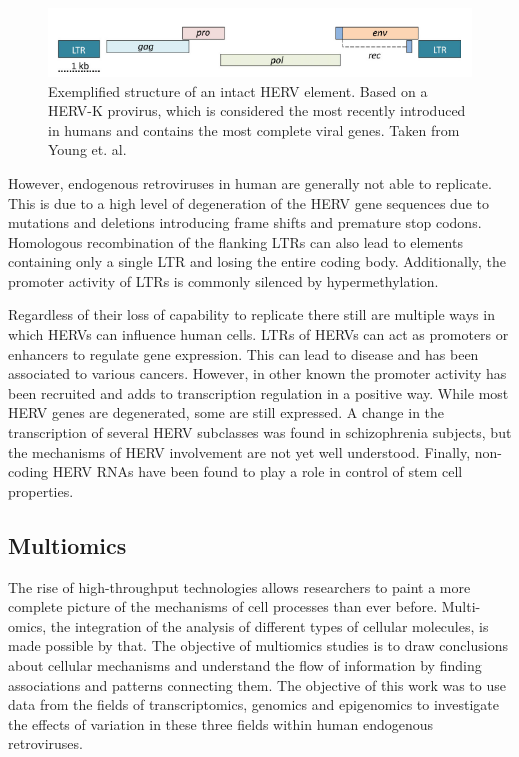 \documentclass[a4paper,12pt,twoside,openright]{article}
\begin{document}
\begin{figure}[b]
	\includegraphics[scale = 0.92, keepaspectratio = true]{../figures/herv_structure_example}  
	\caption{Exemplified structure of an intact HERV element. Based on a HERV-K provirus, which is considered the most recently introduced in humans and contains the most complete viral genes. Taken from Young et. al. \cite{BIES:BIES201300049}}
    \label{fig:herv.structure.example}
\end{figure}

However, endogenous retroviruses in human are generally not able to replicate. This is due to a high level of degeneration of the HERV gene sequences due to mutations and deletions introducing frame shifts and premature stop codons. Homologous recombination of the flanking LTRs can also lead to elements containing only a single LTR and losing the entire coding body\cite{10.1146/annurev.genom.7.080505.115700}. Additionally, the promoter activity of LTRs is commonly silenced by hypermethylation\cite{Smith2013}.

Regardless of their loss of capability to replicate there still are multiple ways in which HERVs can influence human cells. LTRs of HERVs can act as promoters or enhancers to regulate gene expression. This can lead to disease and has been associated to various cancers\cite{10.3892/ijmm.2013.1460}. However, in other known the promoter activity has been recruited and adds to transcription regulation in a positive way\cite{Feschotte2012}. While most HERV genes are degenerated, some are still expressed. A change in the transcription of several HERV subclasses was found in schizophrenia subjects, but the mechanisms of HERV involvement are not yet well understood\cite{10.3389/fpsyt.2015.00183}. Finally, non-coding HERV RNAs have been found to play a role in control of stem cell properties\cite{APM:APM12476}. 

\subsection{Multiomics}
\label{Introduction:Multiomics}
The rise of high-throughput technologies  allows researchers to paint a more complete picture of the mechanisms of cell processes than ever before. Multi-omics, the integration of the analysis of different types of cellular molecules, is made possible by that. The objective of multiomics studies is to draw conclusions about cellular mechanisms and understand the flow of information by finding associations and patterns connecting them\cite{Hasin2017}. The objective of this work was to use data from the fields of transcriptomics, genomics and epigenomics to investigate the effects of variation in these three fields within human endogenous retroviruses.
\end{document}
